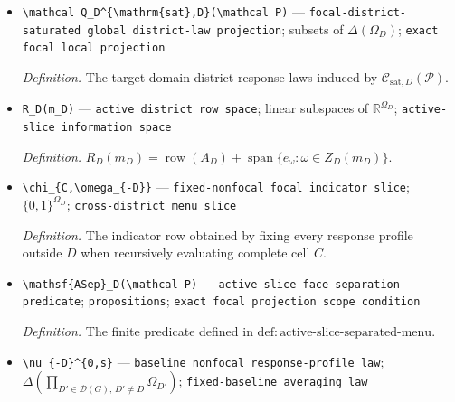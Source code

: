 \documentclass{article}
\begin{document}
\begin{itemize}
  \par\smallskip\noindent\emph{Definition.} The focal-district-saturated SCM families that induce every supplied law in \(\mathcal P\).
  \item \texttt{\textbackslash{}\allowbreak{}mathcal Q\_\allowbreak{}D\textasciicircum{}\{\textbackslash{}\allowbreak{}mathrm\{sat\}\allowbreak{},\allowbreak{}D\}\allowbreak{}(\textbackslash{}\allowbreak{}mathcal P)} --- \texttt{focal-\allowbreak{}district-\allowbreak{}saturated global district-\allowbreak{}law projection}; subsets of \(\Delta(\Omega_D)\); \texttt{exact focal local projection}
  \par\smallskip\noindent\emph{Definition.} The target-domain district response laws induced by \(\mathcal C_{\mathrm{sat},D}(\mathcal P)\).
  \item \texttt{R\_\allowbreak{}D(m\_\allowbreak{}D)} --- \texttt{active district row space}; linear subspaces of \(\mathbb R^{\Omega_D}\); \texttt{active-\allowbreak{}slice information space}
  \par\smallskip\noindent\emph{Definition.} \(R_D(m_D)=\operatorname{row}(A_D)+\operatorname{span}\{e_\omega:\omega\in Z_D(m_D)\}\).
  \item \texttt{\textbackslash{}\allowbreak{}chi\_\allowbreak{}\{C,\allowbreak{}\textbackslash{}\allowbreak{}omega\_\allowbreak{}\{-\allowbreak{}D\}\allowbreak{}\}\allowbreak{}} --- \texttt{fixed-\allowbreak{}nonfocal focal indicator slice}; \(\{0,1\}^{\Omega_D}\); \texttt{cross-\allowbreak{}district menu slice}
  \par\smallskip\noindent\emph{Definition.} The indicator row obtained by fixing every response profile outside \(D\) when recursively evaluating complete cell \(C\).
  \item \texttt{\textbackslash{}\allowbreak{}mathsf\{ASep\}\allowbreak{}\_\allowbreak{}D(\textbackslash{}\allowbreak{}mathcal P)} --- \texttt{active-\allowbreak{}slice face-\allowbreak{}separation predicate}; \texttt{propositions}; \texttt{exact focal projection scope condition}
  \par\smallskip\noindent\emph{Definition.} The finite predicate defined in \(\mathrm{def:active\text{-}slice\text{-}separated\text{-}menu}\).
  \item \texttt{\textbackslash{}\allowbreak{}nu\_\allowbreak{}\{-\allowbreak{}D\}\allowbreak{}\textasciicircum{}\{0,\allowbreak{}s\}\allowbreak{}} --- \texttt{baseline nonfocal response-\allowbreak{}profile law}; \(\Delta(\prod_{D'\in\mathcal D(G),\,D'\ne D}\Omega_{D'})\); \texttt{fixed-\allowbreak{}baseline averaging law}

\end{itemize}
\end{document}
